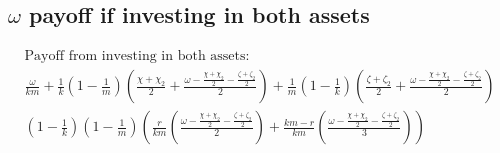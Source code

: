 \documentclass{article}
\begin{document}
\subsection{$\omega$ payoff if investing in both assets}
\label{ROB3}

\begin{align*}
\text{Payoff from investing in both assets:} \\
\frac{\omega}{km}
+\frac{1}{k}
\left(
1-\frac{1}{m}
\right)
\left( \frac{\chi+\chi_2}{2} +\frac{\omega - \frac{\chi+\chi_2}{2}-\frac{\zeta+\zeta_2}{2}}{2}
\right) 
+\frac{1}{m}
\left(
1-\frac{1}{k}\right)\left( \frac{\zeta+\zeta_2}{2} +\frac{\omega - \frac{\chi+\chi_2}{2}-\frac{\zeta+\zeta_2}{2}}{2}\right) \\
\left(
1-\frac{1}{k}
\right)
\left(
1-\frac{1}{m}
\right)
\left(
\frac{r}{km}
\left(
\frac{\omega - \frac{\chi+\chi_2}{2}-\frac{\zeta+\zeta_2}{2}}{2}
\right)
+
\frac{km-r}{km}
\left(
\frac{\omega - \frac{\chi+\chi_2}{2}-\frac{\zeta+\zeta_2}{2}}{3}
\right)
\right)
\end{align*}



\end{document}
